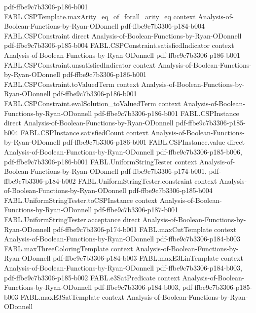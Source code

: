 \begin{theorem}
  {pdf-ffbe9c7b3306-p186-b001}
\proofstep
  {FABL.CSPTemplate.maxArity_eq_of_forall_arity_eq}
  {context}
  {Analysis-of-Boolean-Functions-by-Ryan-ODonnell}
  {pdf-ffbe9c7b3306-p184-b004}
\proofstep
  {FABL.CSPConstraint}
  {direct}
  {Analysis-of-Boolean-Functions-by-Ryan-ODonnell}
  {pdf-ffbe9c7b3306-p185-b004}
\proofstep
  {FABL.CSPConstraint.satisfiedIndicator}
  {context}
  {Analysis-of-Boolean-Functions-by-Ryan-ODonnell}
  {pdf-ffbe9c7b3306-p186-b001}
\proofstep
  {FABL.CSPConstraint.unsatisfiedIndicator}
  {context}
  {Analysis-of-Boolean-Functions-by-Ryan-ODonnell}
  {pdf-ffbe9c7b3306-p186-b001}
\proofstep
  {FABL.CSPConstraint.toValuedTerm}
  {context}
  {Analysis-of-Boolean-Functions-by-Ryan-ODonnell}
  {pdf-ffbe9c7b3306-p186-b001}
\proofstep
  {FABL.CSPConstraint.evalSolution_toValuedTerm}
  {context}
  {Analysis-of-Boolean-Functions-by-Ryan-ODonnell}
  {pdf-ffbe9c7b3306-p186-b001}
\proofstep
  {FABL.CSPInstance}
  {direct}
  {Analysis-of-Boolean-Functions-by-Ryan-ODonnell}
  {pdf-ffbe9c7b3306-p185-b004}
\proofstep
  {FABL.CSPInstance.satisfiedCount}
  {context}
  {Analysis-of-Boolean-Functions-by-Ryan-ODonnell}
  {pdf-ffbe9c7b3306-p186-b001}
\proofstep
  {FABL.CSPInstance.value}
  {direct}
  {Analysis-of-Boolean-Functions-by-Ryan-ODonnell}
  {pdf-ffbe9c7b3306-p185-b006,
    pdf-ffbe9c7b3306-p186-b001}
\proofstep
  {FABL.UniformStringTester}
  {context}
  {Analysis-of-Boolean-Functions-by-Ryan-ODonnell}
  {pdf-ffbe9c7b3306-p174-b001,
    pdf-ffbe9c7b3306-p184-b002}
\proofstep
  {FABL.UniformStringTester.constraint}
  {context}
  {Analysis-of-Boolean-Functions-by-Ryan-ODonnell}
  {pdf-ffbe9c7b3306-p185-b004}
\proofstep
  {FABL.UniformStringTester.toCSPInstance}
  {context}
  {Analysis-of-Boolean-Functions-by-Ryan-ODonnell}
  {pdf-ffbe9c7b3306-p187-b001}
\proofstep
  {FABL.UniformStringTester.acceptance}
  {direct}
  {Analysis-of-Boolean-Functions-by-Ryan-ODonnell}
  {pdf-ffbe9c7b3306-p174-b001}
\proofstep
  {FABL.maxCutTemplate}
  {context}
  {Analysis-of-Boolean-Functions-by-Ryan-ODonnell}
  {pdf-ffbe9c7b3306-p184-b003}
\proofstep
  {FABL.maxThreeColoringTemplate}
  {context}
  {Analysis-of-Boolean-Functions-by-Ryan-ODonnell}
  {pdf-ffbe9c7b3306-p184-b003}
\proofstep
  {FABL.maxE3LinTemplate}
  {context}
  {Analysis-of-Boolean-Functions-by-Ryan-ODonnell}
  {pdf-ffbe9c7b3306-p184-b003,
    pdf-ffbe9c7b3306-p185-b002}
\proofstep
  {FABL.e3SatPredicate}
  {context}
  {Analysis-of-Boolean-Functions-by-Ryan-ODonnell}
  {pdf-ffbe9c7b3306-p184-b003,
    pdf-ffbe9c7b3306-p185-b003}
\proofstep
  {FABL.maxE3SatTemplate}
  {context}
  {Analysis-of-Boolean-Functions-by-Ryan-ODonnell}

\end{theorem}
